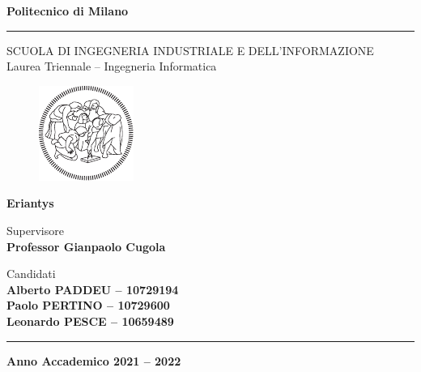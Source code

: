 \documentclass[a4paper, 12pt]{article}
\begin{document}
	\thispagestyle{empty} %
	
	\begin{center}
		\Large{\textbf{Politecnico di Milano}} \\
		\vspace{-4mm}
		\rule{\textwidth}{0.4pt}
		\normalsize{SCUOLA DI INGEGNERIA INDUSTRIALE E DELL’INFORMAZIONE} \\
		\normalsize{Laurea Triennale -- Ingegneria Informatica} \\
		\vspace{20mm}
		\begin{figure}[h!]
			\centering
			\includegraphics[height=0.30\textheight]{logo_poli_bianco}
		\end{figure}
		\vspace{12mm}
		\huge{\textbf{Eriantys}} \\
		\vspace{22mm}
	\end{center}
	
	\begin{flushleft}
		\normalsize{Supervisore} \\
		\small{\textbf{Professor Gianpaolo Cugola}} \\
	\end{flushleft}
	\vspace{10mm}
	
	\begin{flushright}
		\normalsize{Candidati} \\
		\small{\textbf{Alberto PADDEU -- 10729194}} \\
		\small{\textbf{Paolo PERTINO -- 10729600}} \\
		\small{\textbf{Leonardo PESCE -- 10659489}} \\
	\end{flushright}
	\vspace{15mm}
	
	\begin{center}
		\rule{\textwidth}{0.4pt}
		\small{\textbf{Anno Accademico 2021 -- 2022}}
	\end{center}
\end{document}
